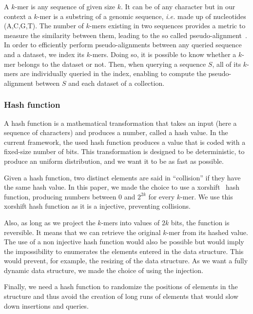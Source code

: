 A $k$-mer is any sequence of given size $k$. It can be of any character but in our context a $k$-mer is a substring of a genomic sequence, \textit{i.e.} made up of nucleotides (A,C,G,T). The number of $k$-mers existing in two sequences provides a metric to measure the similarity between them, leading to the so called pseudo-alignment~\cite{themisto_2023}. In order to efficiently perform pseudo-alignments between any queried sequence and a dataset, we index its $k$-mers. Doing so, it is possible to know whether a $k$-mer belongs to the dataset or not.
Then, when querying a sequence $S$, all of its $k$-mers are individually queried in the index, enabling to compute the pseudo-alignment between $S$ and each dataset of a collection.

\subsubsection{Hash function}

A hash function is a mathematical transformation that takes an input (here a sequence of characters) and produces a number, called a hash value. In the current framework, the used hash function produces a value that is coded with a fixed-size number of bits. This transformation is designed to be deterministic, to produce an uniform distribution, and we want it to be as fast as possible. 

Given a hash function, two distinct elements are said in ``collision'' if they have the same hash value.
In this paper, we made the choice to use a xorshift~\cite{xorshift_2003} hash function, producing numbers between 0 and $2^{2k}$ for every $k$-mer. We use this~\cite{xorshift_64} xorshift hash function as it is a injective, preventing collisions.

Also, as long as we project the $k$-mers into values of $2k$ bits, the function is reversible. It means that we can retrieve the original $k$-mer from its hashed value.
The use of a non injective hash function would also be possible but would imply the impossibility to enumerates the elements entered in the data structure. This would prevent, for example, the resizing of the data structure. As we want a fully dynamic data structure, we made the choice of using the injection.%

Finally, we need a hash function to randomize the positions of elements in the structure and thus avoid the creation of long runs of elements that would slow down insertions and queries.



